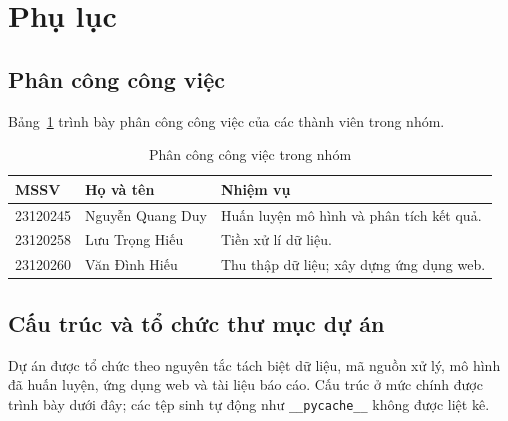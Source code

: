 \section{Phụ lục}
\subsection{Phân công công việc}

Bảng~\ref{tab:work-division} trình bày phân công công việc của các thành viên
trong nhóm.

\begin{table}[H]
\centering
\caption{Phân công công việc trong nhóm}
\label{tab:work-division}
\begin{tabular}{p{}p{}p{}}
\toprule
\textbf{MSSV} & \textbf{Họ và tên} & \textbf{Nhiệm vụ} \\
\midrule
23120245 & Nguyễn Quang Duy & Huấn luyện mô hình và phân tích kết quả. \\
23120258 & Lưu Trọng Hiếu & Tiền xử lí dữ liệu. \\
23120260 & Văn Đình Hiếu & Thu thập dữ liệu; xây dựng ứng dụng web. \\
\bottomrule
\end{tabular}
\end{table}

\subsection{Cấu trúc và tổ chức thư mục dự án}
\label{app:project-structure}

Dự án được tổ chức theo nguyên tắc tách biệt dữ liệu, mã nguồn xử lý, mô hình đã huấn luyện, ứng dụng web và tài liệu báo cáo. Cấu trúc ở mức chính được trình bày dưới đây; các tệp sinh tự động như \texttt{\_\_pycache\_\_} không được liệt kê.

